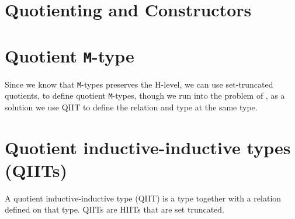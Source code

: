 \documentclass[twoside,11pt,openright]{report}
\theoremstyle{plain} %
\theoremstyle{definition}
\theoremstyle{remark}
\begin{document}
\section{Quotienting and Constructors}
\section{Quotient \texttt{M}-type}
Since we know that \texttt{M}-types preserves the H-level, we can use set-truncated quotients, to define quotient \texttt{M}-types, though we run into the problem of , as a solution we use QIIT to define the relation and type at the same type.

\section{Quotient inductive-inductive types (QIITs)}
A quotient inductive-inductive type (QIIT) is a type together with a relation defined on that type. QIITs are HIITs that are set truncated.
\end{document}
